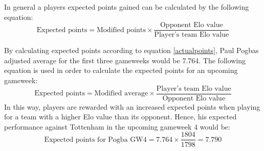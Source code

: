 In general a players expected points gained can be calculated by the following equation: 
\begin{equation} \label{actualpoints}
\textrm{Expected points} = \textrm{Modified points} \times \frac{\textrm{Opponent Elo value}}{\textrm{Player's team Elo value}}    
\end{equation}

By calculating expected points according to equation \ref{actualpoints}, Paul Pogbas adjusted average for the first three gameweeks would be 7.764. The following equation is used in order to calculate the expected points for an upcoming gameweek: 
\begin{equation}
    \textrm{Expected points} = \textrm{Modified average} \times \frac{\textrm{Player's team Elo value}}{\textrm{Opponent Elo value}}
\end{equation}
In this way, players are rewarded with an increased expected points when playing for a team with a higher Elo value than its opponent. Hence, his expected performance against Tottenham in the upcoming gameweek 4 would be: 
\begin{equation*}
    \textrm{Expected points for Pogba GW4} = 7.764 \times \frac{1804}{1798} = 7.790
\end{equation*}


